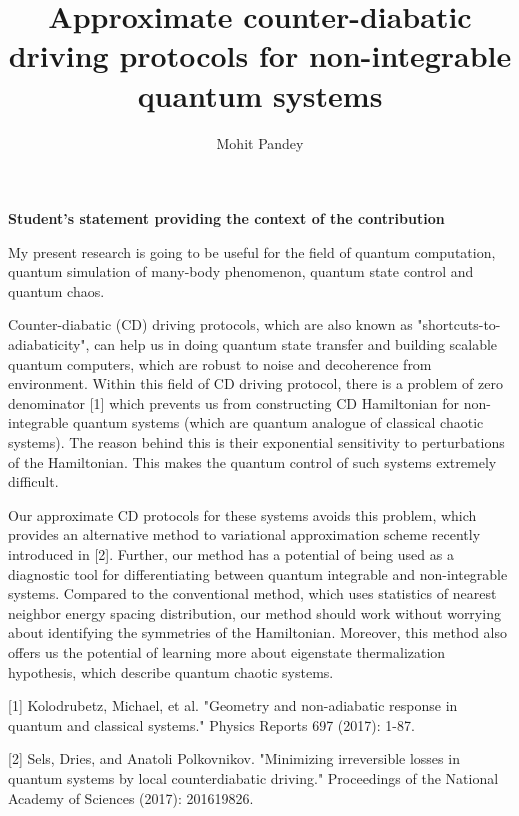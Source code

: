 \documentclass[11pt,a4paper]{article}
\author{Mohit Pandey}
\title{Approximate counter-diabatic driving protocols for non-integrable quantum systems  }
\begin{document}
\maketitle
\textbf{Student's statement  providing the context of the contribution}

My present research is going to be useful for the field of quantum computation, quantum simulation of many-body phenomenon, quantum state control and quantum chaos. 

Counter-diabatic (CD) driving protocols, which are also known as "shortcuts-to-adiabaticity", can help us in doing quantum state transfer and building scalable quantum computers, which are robust to noise and decoherence from environment. Within this field of CD driving protocol, there is a problem of zero denominator  [1] which prevents us from constructing CD Hamiltonian for non-integrable quantum systems (which are quantum analogue of classical chaotic systems). The reason behind this is their exponential sensitivity to perturbations of the Hamiltonian. This makes the quantum control of such systems extremely difficult.

Our approximate CD protocols for these systems avoids this problem, which provides an alternative method to variational approximation scheme recently introduced in [2]. Further, our method has a potential of being used as a diagnostic tool for differentiating between quantum integrable and non-integrable systems. Compared to the conventional method, which uses statistics of nearest neighbor energy spacing distribution, our method should work without worrying about identifying the symmetries of the Hamiltonian. Moreover, this method also offers us the potential of learning more about eigenstate thermalization hypothesis, which describe quantum chaotic systems. 



[1] Kolodrubetz, Michael, et al. "Geometry and non-adiabatic response in quantum and classical systems." Physics Reports 697 (2017): 1-87.

[2] Sels, Dries, and Anatoli Polkovnikov. "Minimizing irreversible losses in quantum systems by local counterdiabatic driving." Proceedings of the National Academy of Sciences (2017): 201619826.
\end{document}
